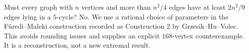 Must every graph with $n$ vertices and more than $n^2/4$ edges have at least $2n^2/9$ edges lying in a $5$-cycle? No. We use a rational choice of parameters in the F\"uredi--Maleki construction recorded as Construction 2 by Grzesik--Hu--Volec. This avoids rounding issues and supplies an explicit $168$-vertex counterexample. It is a reconstruction, not a new extremal result.
